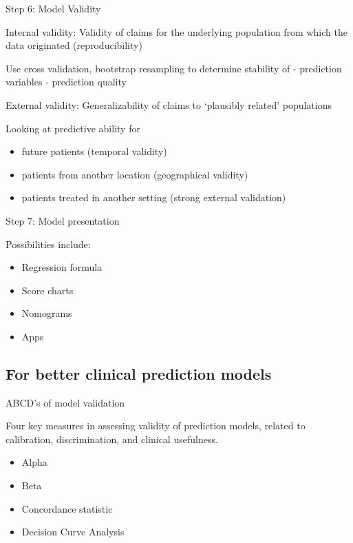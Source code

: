 \documentclass[
  12pt,
  ignorenonframetext,
]{beamer}
\providecommand{\tightlist}{%
  \setlength{\itemsep}{0pt}\setlength{\parskip}{0pt}}
\begin{document}
\begin{frame}{Step 6: Model Validity}
\protect\hypertarget{step-6-model-validity}{}

Internal validity: Validity of claims for the underlying population from
which the data originated (reproducibility)

Use cross validation, bootstrap resampling to determine stability of -
prediction variables - prediction quality

External validity: Generalizability of claims to `plausibly related'
populations

Looking at predictive ability for

\begin{itemize}[<+->]
\tightlist
\item
  future patients (temporal validity)
\item
  patients from another location (geographical validity)
\item
  patients treated in another setting (strong external validation)
\end{itemize}

\end{frame}

\begin{frame}{Step 7: Model presentation}
\protect\hypertarget{step-7-model-presentation}{}

Possibilities include:

\begin{itemize}[<+->]
\tightlist
\item
  Regression formula
\item
  Score charts
\item
  Nomograms
\item
  Apps
\end{itemize}

\end{frame}

\hypertarget{for-better-clinical-prediction-models-1}{%
\subsection{For better clinical prediction
models}\label{for-better-clinical-prediction-models-1}}

\begin{frame}{ABCD's of model validation}
\protect\hypertarget{abcds-of-model-validation}{}

Four key measures in assessing validity of prediction models, related to
calibration, discrimination, and clinical usefulness.

\begin{itemize}[<+->]
\tightlist
\item
  Alpha
\item
  Beta
\item
  Concordance statistic
\item
  Decision Curve Analysis
\end{itemize}

\end{frame}
\end{document}
